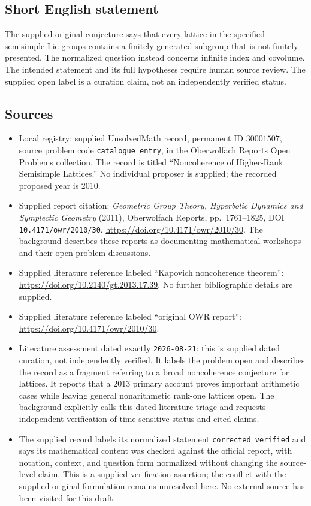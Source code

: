 \documentclass[11pt]{article}
\begin{document}
\subsection{Short English statement}
The supplied original conjecture says that every lattice in the specified semisimple Lie groups contains a finitely generated subgroup that is not finitely presented. The normalized question instead concerns infinite index and covolume. The intended statement and its full hypotheses require human source review. The supplied open label is a curation claim, not an independently verified status.
\subsection{Sources}
\begin{itemize}
\item Local registry: supplied UnsolvedMath record, permanent ID \(30001507\), source problem code \texttt{catalogue entry}, in the Oberwolfach Reports Open Problems collection. The record is titled ``Noncoherence of Higher-Rank Semisimple Lattices.'' No individual proposer is supplied; the recorded proposed year is 2010.
\item Supplied report citation: \emph{Geometric Group Theory, Hyperbolic Dynamics and Symplectic Geometry} (2011), Oberwolfach Reports, pp.\ 1761--1825, DOI \texttt{10.4171/owr/2010/30}. \url{https://doi.org/10.4171/owr/2010/30}. The background describes these reports as documenting mathematical workshops and their open-problem discussions.
\item Supplied literature reference labeled ``Kapovich noncoherence theorem'': \url{https://doi.org/10.2140/gt.2013.17.39}. No further bibliographic details are supplied.
\item Supplied literature reference labeled ``original OWR report'': \url{https://doi.org/10.4171/owr/2010/30}.
\item Literature assessment dated exactly \texttt{2026-08-21}: this is supplied dated curation, not independently verified. It labels the problem open and describes the record as a fragment referring to a broad noncoherence conjecture for lattices. It reports that a 2013 primary account proves important arithmetic cases while leaving general nonarithmetic rank-one lattices open. The background explicitly calls this dated literature triage and requests independent verification of time-sensitive status and cited claims.
\item The supplied record labels its normalized statement \texttt{corrected\_verified} and says its mathematical content was checked against the official report, with notation, context, and question form normalized without changing the source-level claim. This is a supplied verification assertion; the conflict with the supplied original formulation remains unresolved here. No external source has been visited for this draft.
\end{itemize}
\end{document}
